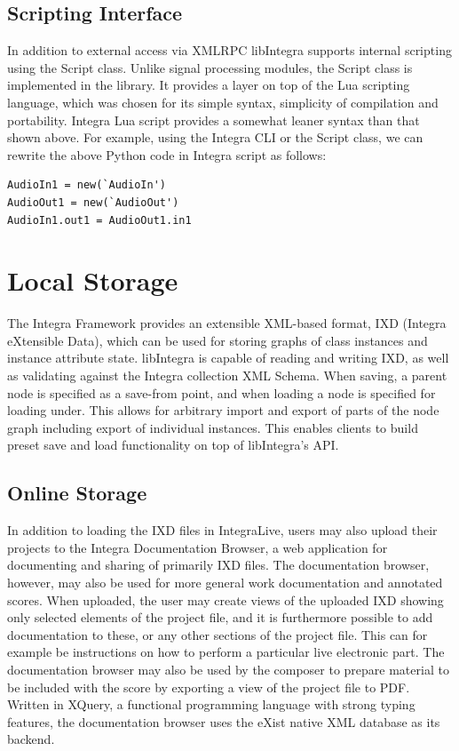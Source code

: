 \documentclass[twoside,10pt,a4paper]{article}
\begin{document}
{\begin{lstlisting}[label=livecode_py,caption=XMLRPC API from Python]
\end{lstlisting}


\subsection{Scripting Interface}

In addition to external access via XMLRPC libIntegra supports internal scripting using the Script class. Unlike signal processing modules, the Script class is implemented in the library. It provides a layer on top of the Lua scripting language, which was chosen for its simple syntax, simplicity of compilation and portability. Integra Lua script provides a somewhat leaner syntax than that shown above. For example, using the Integra CLI or the Script class, we can rewrite the above Python code in Integra script as follows:

\begin{lstlisting}
AudioIn1 = new(`AudioIn')
AudioOut1 = new(`AudioOut')
AudioIn1.out1 = AudioOut1.in1
\end{lstlisting}

\section{Local Storage}

The Integra Framework provides an extensible XML-based format, IXD (Integra eXtensible Data), which can be used for storing graphs of class instances and instance attribute state\cite{Bullock:02}. libIntegra is capable of reading and writing IXD, as well as validating against the Integra collection XML Schema. When saving, a parent node is specified as a save-from point, and when loading a node is specified for loading under. This allows for arbitrary import and export of parts of the node graph including export of individual instances. This enables clients to build preset save and load functionality on top of libIntegra's API.

\subsection{Online Storage}
In addition to loading the IXD files in IntegraLive, users may also upload their projects to the Integra Documentation Browser, a web application for documenting and sharing of primarily IXD files. The documentation browser, however, may also be used for more general work documentation and annotated scores. When uploaded, the user may create views of the uploaded IXD showing only selected elements of the project file, and it is furthermore possible to add documentation to these, or any other sections of the project file. This can for example be instructions on how to perform a particular live electronic part. The documentation browser may also be used by the composer to prepare material to be included with the score by exporting a view of the project file to PDF. Written in XQuery, a functional programming language with strong typing features, the documentation browser uses the eXist native XML database as its backend.

}
\end{document}
